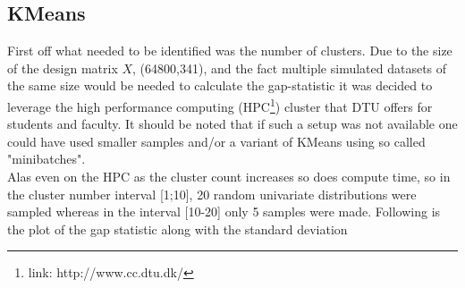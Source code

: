 \subsection{KMeans}
First off what needed to be identified was the number of clusters. 
Due to the size of the design matrix $X$, (64800,341), and the fact multiple simulated datasets of the same size would be needed to calculate the gap-statistic it was decided to leverage the high performance computing (HPC\footnote{link: http://www.cc.dtu.dk/}) cluster that DTU offers for students and faculty. 
 It should be noted that if such a setup was not available one could have used smaller samples and/or a variant of KMeans using so called "minibatches". \\
Alas even on the HPC as the cluster count increases so does compute time, so in the cluster number interval [1;10], 20 random univariate distributions were sampled whereas in the interval [10-20] only 5 samples were made. Following is the plot of the gap statistic along with the standard deviation

